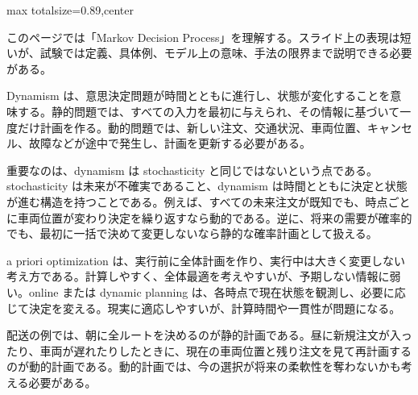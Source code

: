 \begin{minipage}[t]{0.58\textwidth}
\begin{adjustbox}{max totalsize={\textwidth}{0.89\textheight},center}
\begin{minipage}{\textwidth}\scriptsize
{}このページでは「Markov Decision Process」を理解する。スライド上の表現は短いが、試験では定義、具体例、モデル上の意味、手法の限界まで説明できる必要がある。\par
Dynamism は、意思決定問題が時間とともに進行し、状態が変化することを意味する。静的問題では、すべての入力を最初に与えられ、その情報に基づいて一度だけ計画を作る。動的問題では、新しい注文、交通状況、車両位置、キャンセル、故障などが途中で発生し、計画を更新する必要がある。\par
重要なのは、dynamism は stochasticity と同じではないという点である。stochasticity は未来が不確実であること、dynamism は時間とともに決定と状態が進む構造を持つことである。例えば、すべての未来注文が既知でも、時点ごとに車両位置が変わり決定を繰り返すなら動的である。逆に、将来の需要が確率的でも、最初に一括で決めて変更しないなら静的な確率計画として扱える。\par
a priori optimization は、実行前に全体計画を作り、実行中は大きく変更しない考え方である。計算しやすく、全体最適を考えやすいが、予期しない情報に弱い。online または dynamic planning は、各時点で現在状態を観測し、必要に応じて決定を変える。現実に適応しやすいが、計算時間や一貫性が問題になる。\par
配送の例では、朝に全ルートを決めるのが静的計画である。昼に新規注文が入ったり、車両が遅れたりしたときに、現在の車両位置と残り注文を見て再計画するのが動的計画である。動的計画では、今の選択が将来の柔軟性を奪わないかも考える必要がある。\par

\end{minipage}
\end{adjustbox}
\end{minipage}
